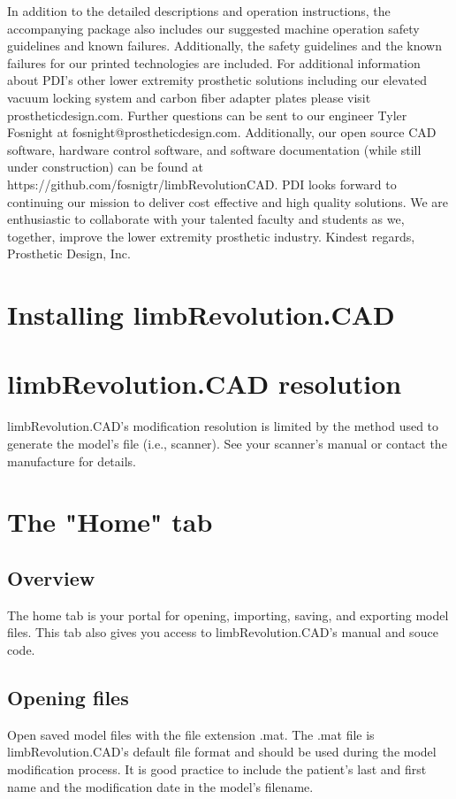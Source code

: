\documentclass[twoside,a4paper]{refrep}
\begin{document}
	In addition to the detailed descriptions and operation instructions, the accompanying package also includes our suggested machine operation safety guidelines and known failures. Additionally, the safety guidelines and the known failures for our printed technologies are included.
	For additional information about PDI’s other lower extremity prosthetic solutions including our elevated vacuum locking system and carbon fiber adapter plates please visit prostheticdesign.com. Further questions can be sent to our engineer Tyler Fosnight at fosnight@prostheticdesign.com. Additionally, our open source CAD software, hardware control software, and software documentation (while still under construction) can be found at https://github.com/fosnigtr/limbRevolutionCAD.
	PDI looks forward to continuing our mission to deliver cost effective and high quality solutions. We are enthusiastic to collaborate with your talented faculty and students as we, together, improve the lower extremity prosthetic industry.
	Kindest regards,
	Prosthetic Design, Inc. 
	
	\section{Installing limbRevolution.CAD}
	\section{limbRevolution.CAD resolution}
	limbRevolution.CAD's modification resolution is limited by the method used to generate the model's file (i.e., scanner). See your scanner's manual or contact the manufacture for details. 
	\section{The "Home" tab}
	\subsection{Overview}
	The home tab is your portal for opening, importing, saving, and exporting model files. This tab also gives you access to limbRevolution.CAD's manual and souce code.
	\subsection{Opening files}
	Open saved model files with the file extension .mat. The .mat file is limbRevolution.CAD's default file format and should be used during the model modification process. It is good practice to include the patient's last and first name and the modification date in the model's filename.  
\end{document}
